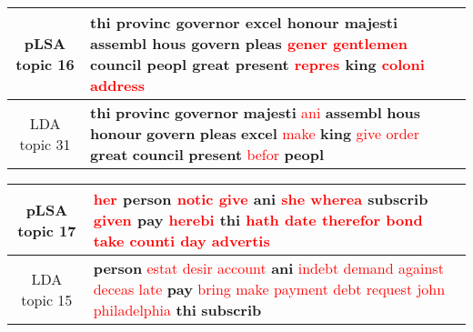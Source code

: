 \begin{center}\begin{tabularx}{\textwidth} {
  | c | >{\raggedright\arraybackslash}X | } \hline 
pLSA topic 16 & \textbf{thi} \textbf{provinc} \textbf{governor} \textbf{excel} \textbf{honour} \textbf{majesti} \textbf{assembl} \textbf{hous} \textbf{govern} \textbf{pleas} \textcolor{red}{gener} \textcolor{red}{gentlemen} \textbf{council} \textbf{peopl} \textbf{great} \textbf{present} \textcolor{red}{repres} \textbf{king} \textcolor{red}{coloni} \textcolor{red}{address} \\ \hline 
LDA topic 31 & \textbf{thi} \textbf{provinc} \textbf{governor} \textbf{majesti} \textcolor{red}{ani} \textbf{assembl} \textbf{hous} \textbf{honour} \textbf{govern} \textbf{pleas} \textbf{excel} \textcolor{red}{make} \textbf{king} \textcolor{red}{give} \textcolor{red}{order} \textbf{great} \textbf{council} \textbf{present} \textcolor{red}{befor} \textbf{peopl} \\ \hline 
\end{tabularx}

\end{center}

\begin{center}\begin{tabularx}{\textwidth} {
  | c | >{\raggedright\arraybackslash}X | } \hline 
pLSA topic 17 & \textcolor{red}{her} \textbf{person} \textcolor{red}{notic} \textcolor{red}{give} \textbf{ani} \textcolor{red}{she} \textcolor{red}{wherea} \textbf{subscrib} \textcolor{red}{given} \textbf{pay} \textcolor{red}{herebi} \textbf{thi} \textcolor{red}{hath} \textcolor{red}{date} \textcolor{red}{therefor} \textcolor{red}{bond} \textcolor{red}{take} \textcolor{red}{counti} \textcolor{red}{day} \textcolor{red}{advertis} \\ \hline 
LDA topic 15 & \textbf{person} \textcolor{red}{estat} \textcolor{red}{desir} \textcolor{red}{account} \textbf{ani} \textcolor{red}{indebt} \textcolor{red}{demand} \textcolor{red}{against} \textcolor{red}{deceas} \textcolor{red}{late} \textbf{pay} \textcolor{red}{bring} \textcolor{red}{make} \textcolor{red}{payment} \textcolor{red}{debt} \textcolor{red}{request} \textcolor{red}{john} \textcolor{red}{philadelphia} \textbf{thi} \textbf{subscrib} \\ \hline 
\end{tabularx}

\end{center}

